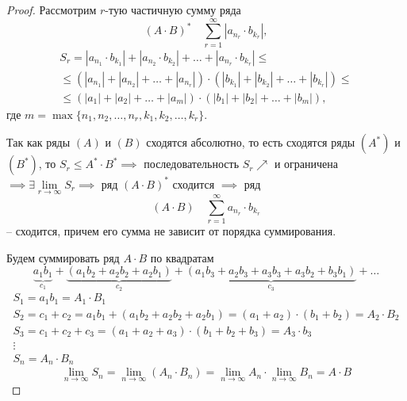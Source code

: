 \documentclass{report}
\theoremstyle{definition}
\begin{document}
\begin{proof}
  Рассмотрим $r$-тую частичную сумму ряда
  \begin{equation*}
    (A\cdot B)^* \quad \sum_{r=1}^{\infty}|a_{n_r}\cdot b_{k_r}|,
  \end{equation*}
  \begin{multline*}
    S_r = |a_{n_1} \cdot b_{k_1}| + |a_{n_2} \cdot b_{k_2}| + \ldots + |a_{n_r} \cdot b_{k_r}| \leqslant \\
    \leqslant (|a_{n_1}| + |a_{n_2}| + \ldots + |a_{n_r}|) \cdot (|b_{k_1}| + |b_{k_2}| + \ldots + |b_{k_r}|) \leqslant \\
    \leqslant (|a_1| + |a_2| + \ldots + |a_m|) \cdot (|b_1| + |b_2| + \ldots + |b_m|),
  \end{multline*}
  где $m = \max\{n_1,n_2,\ldots,n_r,k_1,k_2,\ldots,k_r\}$.

  Так как ряды $(A)$ и $(B)$ сходятся абсолютно, то есть сходятся ряды $(A^*)$ и $(B^*)$, то $S_r \leqslant A^* \cdot B^* \implies$ последовательность $S_r \nearrow$ и ограничена $\implies \exists \underset{r\rightarrow\infty}{\lim} S_r \implies$ ряд $(A\cdot B)^*$ сходится $\implies$ ряд
  \begin{equation*}
    (A\cdot B) \quad \sum_{r=1}^{\infty}a_{n_r}\cdot b_{k_r}
  \end{equation*} -- сходится, причем его сумма не зависит от порядка суммирования.

  Будем суммировать ряд $A\cdot B$ по квадратам
  \begin{equation*}
    \underbrace{a_1b_1}_{c_1} + \underbrace{(a_1b_2 + a_2 b_2 + a_2 b_1)}_{c_2} + \underbrace{(a_1b_3 + a_2b_3 + a_3b_3 + a_3b_2 + b_3b_1)}_{c_3} + \ldots
  \end{equation*}
  \begin{equation*}
    \begin{array}{l}
      S_1 = a_1b_1 = A_1\cdot B_1                                                                        \\
      S_2 = c_1 + c_2 = a_1b_1 + (a_1b_2 + a_2b_2 + a_2b_1) = (a_1 + a_2)\cdot(b_1 + b_2) = A_2\cdot B_2 \\
      S_3 = c_1 + c_2 + c_3 = (a_1 + a_2 + a_3)\cdot(b_1 + b_2 + b_3) = A_3\cdot b_3                     \\
      \vdots                                                                                             \\
      S_n = A_n \cdot B_n
    \end{array}
  \end{equation*}
  \begin{equation*}
    \underset{n\rightarrow\infty}{\lim}S_n = \underset{n\rightarrow\infty}{\lim}(A_n \cdot B_n) = \underset{n\rightarrow\infty}{\lim}A_n \cdot \underset{n\rightarrow\infty}{\lim}B_n = A\cdot B
  \end{equation*}
\end{proof}
\end{document}
